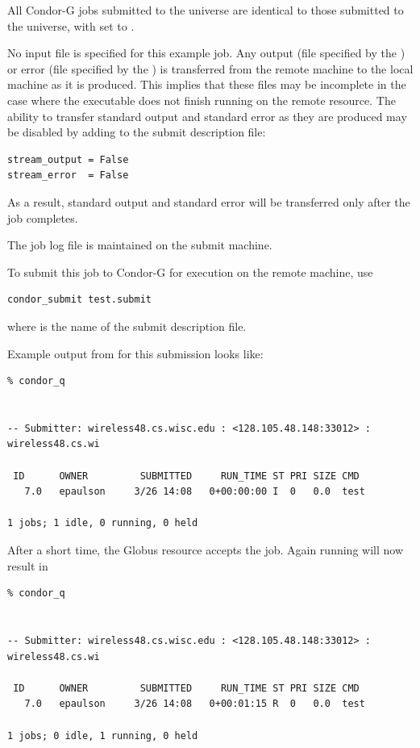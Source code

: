 All Condor-G jobs 
submitted to the  universe
are identical to those submitted to the  universe,
with  set to .

No input file is specified for this example job.
Any output (file specified by the )
or error (file specified by the )
is transferred 
from the remote machine to the local machine as it is produced.
This implies that these files may be incomplete in the case
where the executable does not finish running on the remote resource.
The ability to transfer standard output and standard error as
they are produced may be disabled by adding to the submit
description file:
\begin{verbatim}
stream_output = False
stream_error  = False
\end{verbatim}
As a result, standard output and standard error will be transferred
only after the job completes.

The job log file is maintained on the submit machine.

To submit this job to Condor-G for execution on the
remote machine, use
\begin{verbatim}
condor_submit test.submit
\end{verbatim}
where  is the name of the submit description file.

Example output from 
 for this submission looks like:
\footnotesize
\begin{verbatim}
% condor_q


-- Submitter: wireless48.cs.wisc.edu : <128.105.48.148:33012> : wireless48.cs.wi

 ID      OWNER         SUBMITTED     RUN_TIME ST PRI SIZE CMD
   7.0   epaulson     3/26 14:08   0+00:00:00 I  0   0.0  test

1 jobs; 1 idle, 0 running, 0 held
\end{verbatim}
\normalsize

After a short time, the Globus resource accepts the job.
Again running  will now result in

\footnotesize
\begin{verbatim}
% condor_q


-- Submitter: wireless48.cs.wisc.edu : <128.105.48.148:33012> : wireless48.cs.wi

 ID      OWNER         SUBMITTED     RUN_TIME ST PRI SIZE CMD
   7.0   epaulson     3/26 14:08   0+00:01:15 R  0   0.0  test

1 jobs; 0 idle, 1 running, 0 held
\end{verbatim}
\normalsize

